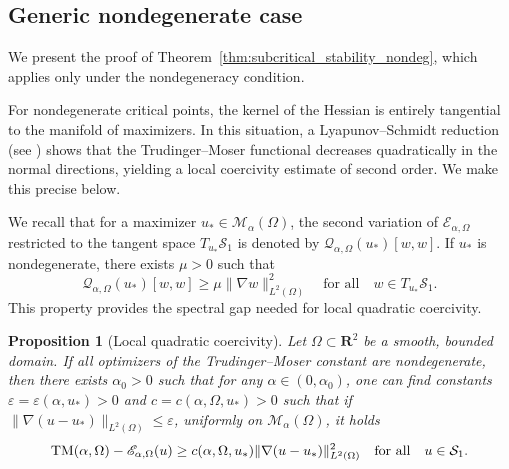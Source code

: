 \documentclass[reqno,11pt]{amsart}
\newtheorem{proposition}[theorem]{Proposition}
\theoremstyle{definition}
\begin{document}
\subsection{Generic nondegenerate case}\label{subsec:generic_nondeg}
We present the proof of Theorem~\ref{thm:subcritical_stability_nondeg}, which applies only under the nondegeneracy condition.

For nondegenerate critical points, the kernel of the Hessian is entirely tangential
to the manifold of maximizers. In this situation, a Lyapunov--Schmidt reduction
(see \cite{BE,MR4427104})
shows that the Trudinger--Moser functional decreases quadratically in the normal directions,
yielding a local coercivity estimate of second order. We make this precise below.

We recall that for a maximizer $u_*\in\mathcal{M}_\alpha(\Omega)$, 
the second variation of $\mathscr{E}_{\alpha,\Omega}$ restricted to the tangent 
space $T_{u_*}\mathcal{S}_1$ is denoted by $\mathscr{Q}_{\alpha,\Omega}(u_*)[w,w]$. 
If $u_*$ is nondegenerate, there exists $\mu>0$ such that
\[
\mathscr{Q}_{\alpha,\Omega}(u_*)[w,w]\ge \mu\|\nabla w\|_{L^2(\Omega)}^2
\quad \text{for all} \quad w\in T_{u_*}\mathcal{S}_1.
\]
This property provides the spectral gap needed for local quadratic coercivity.

\begin{proposition}[Local quadratic coercivity]\label{prop:local_coercivity}
Let $\Omega\subset\mathbf{R}^2$ be a smooth, bounded domain.
If all optimizers of the Trudinger--Moser constant are nondegenerate, then there exists $\alpha_0>0$ such that for any $\alpha\in(0,\alpha_0)$, one can find constants $\varepsilon=\varepsilon(\alpha,u_*)>0$ and $c=c(\alpha,\Omega,u_*)>0$ such that if $\|\nabla(u-u_*)\|_{L^2(\Omega)}\le \varepsilon$, uniformly on $\mathcal{M}_\alpha(\Omega)$, it holds
\begin{equation}\label{eq:local_stability}
    {\rm TM}(\alpha,\Omega)-\mathscr{E}_{\alpha,\Omega}(u)
\ge
c(\alpha,\Omega,u_*)\|\nabla(u-u_*)\|_{L^2(\Omega)}^2
\quad {\rm for \ all} \quad u\in\mathcal{S}_1.
\end{equation}
\end{proposition}
\end{document}
